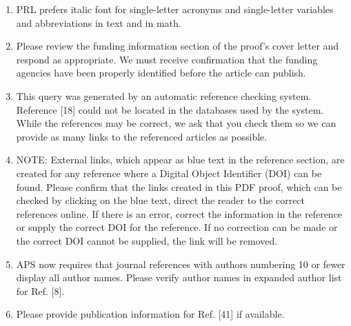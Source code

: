 \documentclass[a4paper,11pt,twoside]{article}
\begin{document}
\begin{enumerate}
\item PRL prefers italic font for single-letter acronyms and single-letter 
   variables and abbreviations in text and in math.

\item Please review the funding information section of the proof's cover letter 
   and respond as appropriate. We must receive confirmation that the funding 
      agencies have been properly identified before the article can publish.

\item This query was generated by an automatic reference checking system.  
   Reference [18] could not be located in the databases used by the system.  
      While the references may be correct, we ask that you check them so we can 
      provide as many links to the referenced articles as possible.  

\item NOTE: External links, which appear as blue text in the reference section, 
   are created for any reference where a Digital Object Identifier (DOI) can be 
      found. Please confirm that the links created in this PDF proof, which can 
      be checked by clicking on the blue text, direct the reader to the correct 
      references online. If there is an error, correct the information in the 
      reference or supply the correct DOI for the reference. If no correction 
      can be made or the correct DOI cannot be supplied, the link will be 
      removed.

   \item  APS now requires that journal references with authors numbering 10 or 
      fewer display all author names. Please verify author names in expanded 
      author list for Ref. [8].

\item Please provide publication information for Ref. [41] if available.

\end{enumerate}
\end{document}
